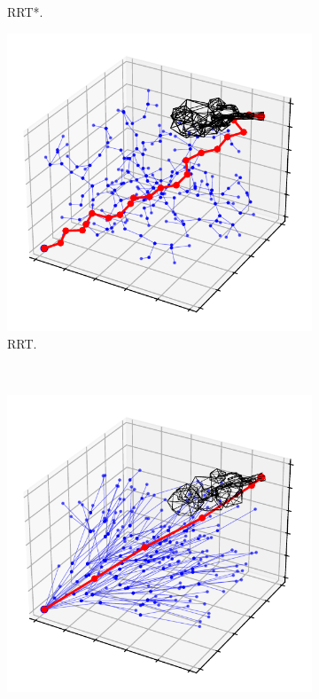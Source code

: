 \documentclass{ctuthesis}
\begin{document}
\begin{figure}[!ht]
\begin{subfigure}[b]{0.45\textwidth}
      \caption{RRT*.}
      \label{fig:rrtstarMaze}
  \end{subfigure}  
  \begin{subfigure}[b]{0.45\textwidth}
      \includegraphics[width=\textwidth]{figChap3/6DRRT_new.pdf}
      \caption{RRT.}
      \label{fig:rrt6D} 
  \end{subfigure}
  ~ %
  \begin{subfigure}[b]{0.45\textwidth}
      \includegraphics[width=\textwidth]{figChap3/6DRRTstar3_new.pdf}

\end{subfigure}
\end{figure}
\end{document}
